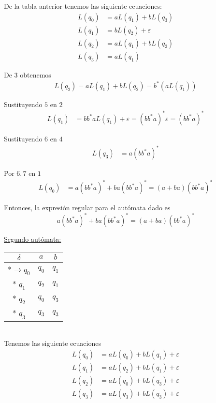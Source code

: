 \documentclass{article}
\begin{document}
\begin{enumerate}
    \setcounter{equation}{0}
    De la tabla anterior tenemos las siguiente ecuaciones:
    \begin{align}
      L(q_0) &= aL(q_1) + bL(q_3) \\
      L(q_1) &= bL(q_2) + \varepsilon \\
      L(q_2) &= aL(q_1) + bL(q_2) \\
      L(q_3) &= aL(q_1) 
    \end{align}

    De $3$ obtenemos
    \begin{align}
      L(q_2) = aL(q_1) + bL(q_2) = b^*(aL(q_1))
    \end{align}

    Sustituyendo $5$ en $2$
    \begin{align}
      L(q_1) &= bb^*aL(q_1) + \varepsilon = (bb^*a)^*\varepsilon = (bb^*a)^*
    \end{align}

    Sustituyendo $6$ en $4$
    \begin{align}
      L(q_3) &= a(bb^*a)^*
    \end{align}

    Por $6, 7$ en $1$
    \begin{align}
      L(q_0) &= a(bb^*a)^* + ba(bb^*a)^* = (a + ba)(bb^*a)^*
    \end{align}

    Entonces, la expresión regular para el autómata dado es
    $$\boxed{a(bb^*a)^* + ba(bb^*a)^* = (a + ba)(bb^*a)^*}$$

    \underline{Segundo autómata:}
    \begin{table}[h]
      \centering
        \begin{tabular}{c|c|c}
            $\delta$ & $a$ & $b$ \\ \hline
            *$\rightarrow q_0$ & $q_0$ & $q_1$ \\
          * $q_1$ & $q_2$ & $q_1$ \\
          * $q_2$ & $q_0$ & $q_3$ \\
          * $q_3$ & $q_3$ & $q_3$
        \end{tabular}
    \end{table}\\

    \setcounter{equation}{0}
    Tenemos las siguiente ecuaciones
    \begin{align}
      L(q_0) &= aL(q_0) + bL(q_1) + \varepsilon \\
      L(q_1) &= aL(q_2) + bL(q_1) + \varepsilon \\
      L(q_2) &= aL(q_0) + bL(q_3) + \varepsilon \\
      L(q_3) &= aL(q_3) + bL(q_3) + \varepsilon 
    \end{align}
    \end{enumerate}
\end{document}

